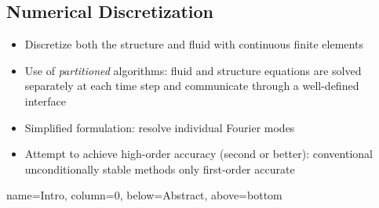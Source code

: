 \documentclass[
paperwidth=48in,paperheight=36in,
fontscale=0.4
]{baposter}
\begin{document}
\begin{poster}
{\subsection{Numerical Discretization}
\begin{itemize}
    \item Discretize both the structure and fluid with continuous finite
          elements
    \item Use of \emph{partitioned} algorithms: fluid and structure equations
          are solved separately at each time step and communicate through a
          well-defined interface
    \item Simplified formulation: resolve individual Fourier modes
    \item Attempt to achieve high-order accuracy (second or better):
          conventional unconditionally stable methods only first-order accurate
\end{itemize}


    \phantom{A}
}


          {name=Intro, column=0, below=Abstract, above=bottom}
{
\begin{center}
\end{center}}
\end{poster}
\end{document}
